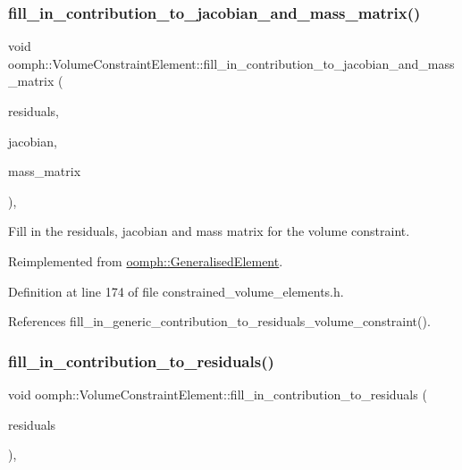 \subsubsection{\texorpdfstring{fill\+\_\+in\+\_\+contribution\+\_\+to\+\_\+jacobian\+\_\+and\+\_\+mass\+\_\+matrix()}{fill\_in\_contribution\_to\_jacobian\_and\_mass\_matrix()}}
{\footnotesize\ttfamily void oomph\+::\+Volume\+Constraint\+Element\+::fill\+\_\+in\+\_\+contribution\+\_\+to\+\_\+jacobian\+\_\+and\+\_\+mass\+\_\+matrix (\begin{DoxyParamCaption}\item[{\hyperlink{classoomph_1_1Vector}{Vector}$<$ double $>$ \&}]{residuals,  }\item[{\hyperlink{classoomph_1_1DenseMatrix}{Dense\+Matrix}$<$ double $>$ \&}]{jacobian,  }\item[{\hyperlink{classoomph_1_1DenseMatrix}{Dense\+Matrix}$<$ double $>$ \&}]{mass\+\_\+matrix }\end{DoxyParamCaption})\hspace{0.3cm}{\ttfamily [inline]}, {\ttfamily [virtual]}}



Fill in the residuals, jacobian and mass matrix for the volume constraint. 



Reimplemented from \hyperlink{classoomph_1_1GeneralisedElement_a2b6294a730647cf865da94f2531466f8}{oomph\+::\+Generalised\+Element}.



Definition at line 174 of file constrained\+\_\+volume\+\_\+elements.\+h.



References fill\+\_\+in\+\_\+generic\+\_\+contribution\+\_\+to\+\_\+residuals\+\_\+volume\+\_\+constraint().

\mbox{\label{classoomph_1_1VolumeConstraintElement_a15162ac88c571496cc4f9ab5afa51c52}} 
\subsubsection{\texorpdfstring{fill\+\_\+in\+\_\+contribution\+\_\+to\+\_\+residuals()}{fill\_in\_contribution\_to\_residuals()}}
{\footnotesize\ttfamily void oomph\+::\+Volume\+Constraint\+Element\+::fill\+\_\+in\+\_\+contribution\+\_\+to\+\_\+residuals (\begin{DoxyParamCaption}\item[{\hyperlink{classoomph_1_1Vector}{Vector}$<$ double $>$ \&}]{residuals }\end{DoxyParamCaption})\hspace{0.3cm}{\ttfamily [inline]}, {\ttfamily [virtual]}}



